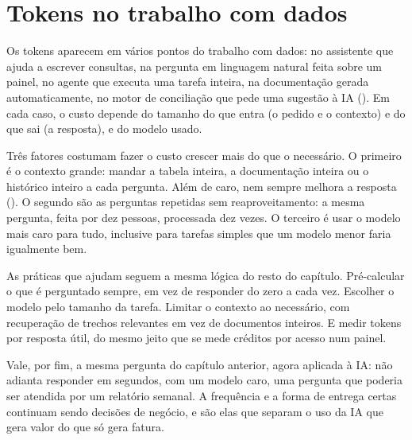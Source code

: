 \section{Tokens no trabalho com dados}
\label{sec:tokens-dados}

Os tokens aparecem em vários pontos do trabalho com dados: no assistente que ajuda a escrever
consultas, na pergunta em linguagem natural feita sobre um painel, no agente que executa uma
tarefa inteira, na documentação gerada automaticamente, no motor de conciliação que pede uma
sugestão à IA (). Em cada caso, o custo depende do tamanho do que
entra (o pedido e o contexto) e do que sai (a resposta), e do modelo usado.

Três fatores costumam fazer o custo crescer mais do que o necessário. O primeiro é o contexto
grande: mandar a tabela inteira, a documentação inteira ou o histórico inteiro a cada
pergunta. Além de caro, nem sempre melhora a resposta (). O segundo
são as perguntas repetidas sem reaproveitamento: a mesma pergunta, feita por dez pessoas,
processada dez vezes. O terceiro é usar o modelo mais caro para tudo, inclusive para tarefas
simples que um modelo menor faria igualmente bem.

As práticas que ajudam seguem a mesma lógica do resto do capítulo. Pré-calcular o que é
perguntado sempre, em vez de responder do zero a cada vez. Escolher o modelo pelo tamanho da
tarefa. Limitar o contexto ao necessário, com recuperação de trechos relevantes em vez de
documentos inteiros. E medir tokens por resposta útil, do mesmo jeito que se mede créditos por
acesso num painel.

Vale, por fim, a mesma pergunta do capítulo anterior, agora aplicada à IA: não adianta
responder em segundos, com um modelo caro, uma pergunta que poderia ser atendida por um
relatório semanal. A frequência e a forma de entrega certas continuam sendo decisões de
negócio, e são elas que separam o uso da IA que gera valor do que só gera fatura.

\begin{leituras}
\end{leituras}
